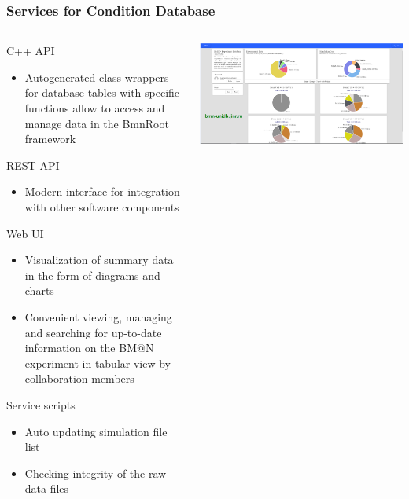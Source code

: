 \documentclass[8pt,pdf,hyperref={unicode}]{beamer}
\begin{document}
\begin{frame}
	\frametitle{Services for Condition Database}
	\begin{columns}
		\begin{column}{0.5\linewidth}
			C++ API
			\begin{itemize}
				\item Autogenerated class wrappers for database tables with specific functions allow to access and manage data in the BmnRoot framework
			\end{itemize}
			REST API
			\begin{itemize}
				\item Modern interface for integration with other software components
			\end{itemize}
			Web UI
			\begin{itemize}
				\item Visualization of summary data in the form of diagrams and charts
				\item Convenient viewing, managing and searching for up-to-date information on the BM@N experiment in tabular view by collaboration members
			\end{itemize}
			Service scripts
			\begin{itemize}
				\item Auto updating simulation file list
				\item Checking integrity of the raw data files
			\end{itemize}
		\end{column}
		\begin{column}{0.5\linewidth}
			\includegraphics[width=\linewidth]{image/slide4.png}
		\end{column}
	\end{columns}
\end{frame}
\end{document}
